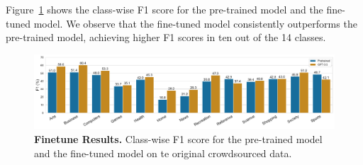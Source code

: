 


Figure~\ref{fig:finetune-results} shows the class-wise F1 score for the pre-trained model and the fine-tuned model. We observe that the fine-tuned model consistently outperforms the pre-trained model, achieving higher F1 scores in ten out of the 14 classes.

\begin{figure}
    \centering
    \includegraphics[width=\textwidth]{./figures/exp2-mf1.pdf}
    \caption{\textbf{Finetune Results.} Class-wise F1 score for the pre-trained model and the fine-tuned model on te original crowdsourced data.}
    \label{fig:finetune-results}
\end{figure}
